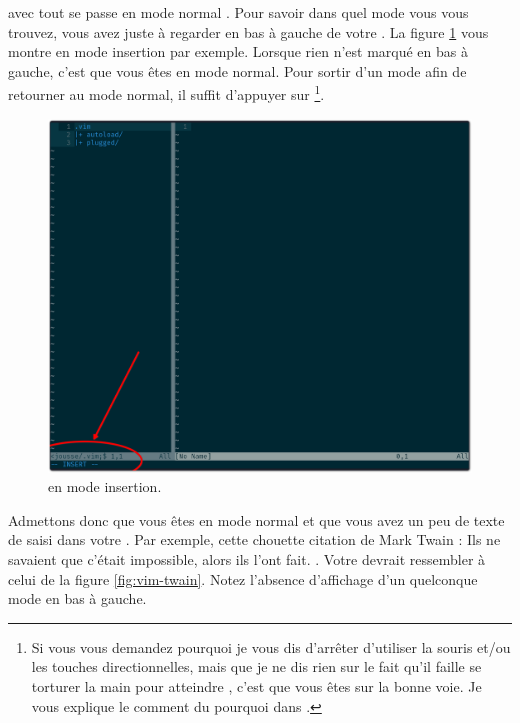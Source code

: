  avec \vim tout se passe en mode \og normal \fg. Pour savoir dans quel mode vous vous trouvez, vous avez juste à regarder en bas à gauche de votre \vim. La figure \ref{fig:insert} vous montre \vim en mode \og insertion \fg{} par exemple. Lorsque rien n'est marqué en bas à gauche, c'est que vous êtes en mode normal. Pour sortir d'un mode afin de retourner au mode normal, il suffit d'appuyer sur \ttesc\footnote{Si vous vous demandez pourquoi je vous dis d'arrêter d'utiliser la souris et/ou les touches directionnelles, mais que je ne dis rien sur le fait qu'il faille se torturer la main pour atteindre \ttesc, c'est que vous êtes sur la bonne voie. Je vous explique le comment du pourquoi dans \og {} \fg.}.

\begin{figure}%
  \includegraphics[width=\linewidth]{graphics/vim-insert.png}
  \caption{\vim en mode insertion.}
  \label{fig:insert}
\end{figure}

Admettons donc que vous êtes en mode \og normal \fg{} et que vous avez un peu de texte de saisi dans votre \vim. Par exemple, cette chouette citation de Mark Twain : \og Ils ne savaient que c'était impossible, alors ils l'ont fait. \fg{}. Votre \vim devrait ressembler à celui de la figure \ref{fig:vim-twain}. Notez l'absence d'affichage d'un quelconque mode en bas à gauche.

